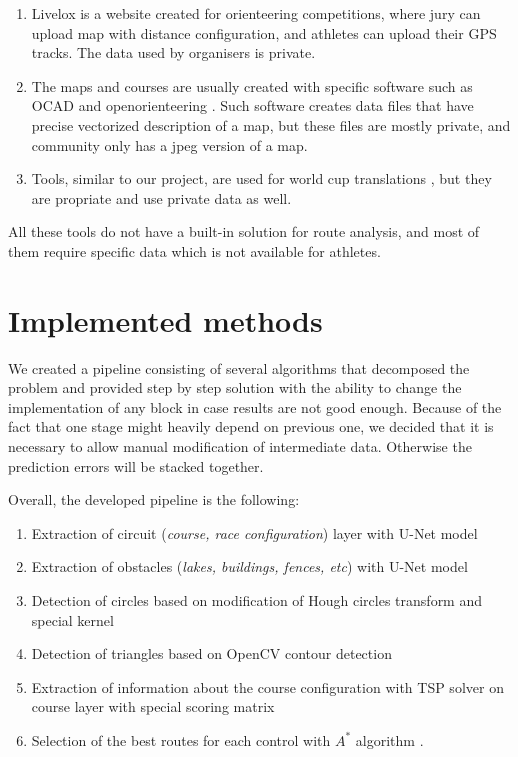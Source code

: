 \documentclass[a4paper,12pt]{extarticle}
\begin{document}
\begin{enumerate}
    \item Livelox \cite{livelox} is a website created for orienteering competitions, where jury can upload map with distance configuration, and athletes can upload their GPS tracks.
The data used by organisers is private. 
    \item The maps and courses are usually created with specific software such as OCAD \cite{ocad} and openorienteering \cite{openorienteering}. 
Such software creates data files that have precise vectorized description of a map, but these files are mostly private, and community only has a jpeg version of a map.
    \item Tools, similar to our project, are used for world cup translations \cite{worldcup}, but they are propriate and use private data as well.
\end{enumerate}

All these tools do not have a built-in solution for route analysis, and most of them require specific data which is not available for athletes.

\section{Implemented methods}

We created a pipeline consisting of several algorithms that decomposed the problem and provided step by step solution with the ability to change the implementation of any block in case results are not good enough.
Because of the fact that one stage might heavily depend on previous one, we decided that it is necessary to allow manual modification of intermediate data.
Otherwise the prediction errors will be stacked together.


Overall, the developed pipeline is the following:
\begin{enumerate}
\item Extraction of circuit (\textit{course, race configuration}) layer with U-Net model \cite{unet}
\item Extraction of obstacles (\textit{lakes, buildings, fences, etc}) with U-Net model \cite{unet}
\item Detection of circles based on modification of Hough circles transform \cite{houghcircles} and special kernel 
\item Detection of triangles based on OpenCV contour detection \cite{findcontours}
\item Extraction of information about the course configuration with TSP solver \cite{tspsolver} on course layer with special scoring matrix
\item Selection of the best routes for each control with $A^*$ algorithm \cite{astar}.
\end{enumerate}
\end{document}
